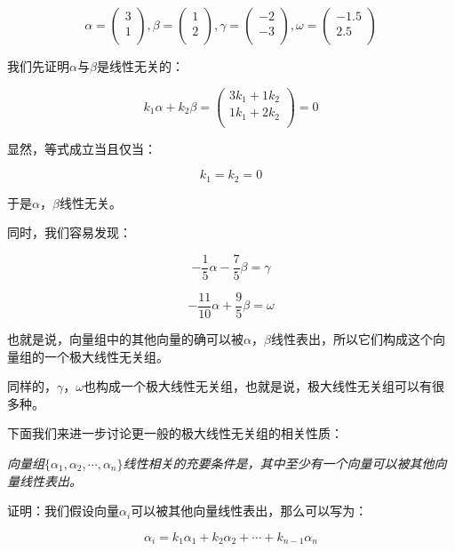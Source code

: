 \documentclass[a4paper]{ctexart}
\begin{document}
$$
\alpha=
\left(
  \begin{array}{cccc}
    3\\
    1\\
  \end{array}
\right)
,
\beta=
\left(
  \begin{array}{cccc}
    1\\
    2\\
  \end{array}
\right)
,
\gamma=
\left(
  \begin{array}{cccc}
    -2\\
    -3\\
  \end{array}
\right)
,
\omega=
\left(
  \begin{array}{cccc}
    -1.5\\
    2.5\\
  \end{array}
\right)
$$

我们先证明$\alpha$与$\beta$是线性无关的：

$$
k_1\alpha+k_2\beta
=
\left(
  \begin{array}{cccc}
    3k_1+1k_2\\
    1k_1+2k_2\\
  \end{array}
\right)
=
0
$$
  
显然，等式成立当且仅当：

$$
k_1=k_2=0
$$

于是$\alpha$，$\beta$线性无关。

同时，我们容易发现：

$$
-\frac{1}{5}\alpha-\frac{7}{5}\beta=\gamma
$$

$$
-\frac{11}{10}\alpha+\frac{9}{5}\beta=\omega
$$

也就是说，向量组中的其他向量的确可以被$\alpha$，$\beta$线性表出，所以它们构成这个向量组的一个极大线性无关组。

同样的，$\gamma$，$\omega$也构成一个极大线性无关组，也就是说，极大线性无关组可以有很多种。

下面我们来进一步讨论更一般的极大线性无关组的相关性质：

\textit{向量组$\{\alpha_1,\alpha_2,\cdots,\alpha_n\}$线性相关的充要条件是，其中至少有一个向量可以被其他向量线性表出。}

证明：我们假设向量$\alpha_{i}$可以被其他向量线性表出，那么可以写为：

$$
\alpha_{i}=k_{1}\alpha_{1}+k_{2}\alpha_{2}+\cdots+k_{n-1}\alpha_{n}
$$
\end{document}

